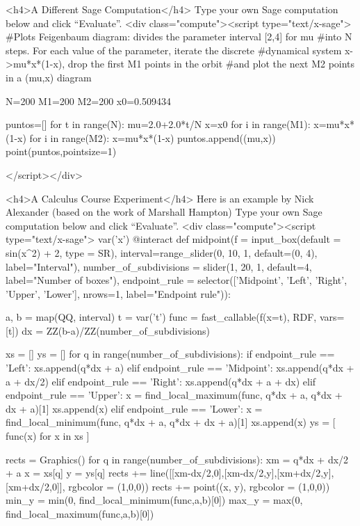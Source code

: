 \documentclass[11pt, oneside]{article}   	%
\begin{document}
\begin{html}
<h4>A Different Sage Computation</h4>
Type your own Sage computation below and click “Evaluate”.
    <div class="compute"><script type="text/x-sage">
#Plots Feigenbaum diagram: divides the parameter interval [2,4] for mu
#into N steps. For each value of the parameter, iterate the discrete
#dynamical system x->mu*x*(1-x), drop the first M1 points in the orbit
#and plot the next M2 points in a (mu,x) diagram

N=200
M1=200
M2=200
x0=0.509434

puntos=[]
for t in range(N):
   mu=2.0+2.0*t/N
   x=x0
   for i in range(M1):
       x=mu*x*(1-x)
   for i in range(M2):
       x=mu*x*(1-x)
       puntos.append((mu,x))
point(puntos,pointsize=1)

</script></div>

<h4>A Calculus Course Experiment</h4>
Here is an example by Nick Alexander (based on the work of Marshall Hampton)
Type your own Sage computation below and click “Evaluate”.
    <div class="compute"><script type="text/x-sage">
var('x')
@interact
def midpoint(f = input_box(default = sin(x^2) + 2, type = SR),
    interval=range_slider(0, 10, 1, default=(0, 4), label="Interval"),
    number_of_subdivisions = slider(1, 20, 1, default=4, label="Number of boxes"),
    endpoint_rule = selector(['Midpoint', 'Left', 'Right', 'Upper', 'Lower'], nrows=1, label="Endpoint rule")):

    a, b = map(QQ, interval)
    t = var('t')
    func = fast_callable(f(x=t), RDF, vars=[t])
    dx = ZZ(b-a)/ZZ(number_of_subdivisions)
   
    xs = []
    ys = []
    for q in range(number_of_subdivisions):
        if endpoint_rule == 'Left':
            xs.append(q*dx + a)
        elif endpoint_rule == 'Midpoint':
            xs.append(q*dx + a + dx/2)
        elif endpoint_rule == 'Right':
            xs.append(q*dx + a + dx)
        elif endpoint_rule == 'Upper':
            x = find_local_maximum(func, q*dx + a, q*dx + dx + a)[1]
            xs.append(x)
        elif endpoint_rule == 'Lower':
            x = find_local_minimum(func, q*dx + a, q*dx + dx + a)[1]
            xs.append(x)
    ys = [ func(x) for x in xs ]
         
    rects = Graphics()
    for q in range(number_of_subdivisions):
        xm = q*dx + dx/2 + a
        x = xs[q]
        y = ys[q]
        rects += line([[xm-dx/2,0],[xm-dx/2,y],[xm+dx/2,y],[xm+dx/2,0]], rgbcolor = (1,0,0))
        rects += point((x, y), rgbcolor = (1,0,0))
    min_y = min(0, find_local_minimum(func,a,b)[0])
    max_y = max(0, find_local_maximum(func,a,b)[0])


\end{html}
\end{document}
